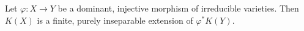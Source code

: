 Let $\varphi: X \rightarrow Y$ be a dominant, injective morphism of irreducible varieties. Then $K(X)$ is a finite, purely inseparable extension of $\varphi^*K(Y)$.
